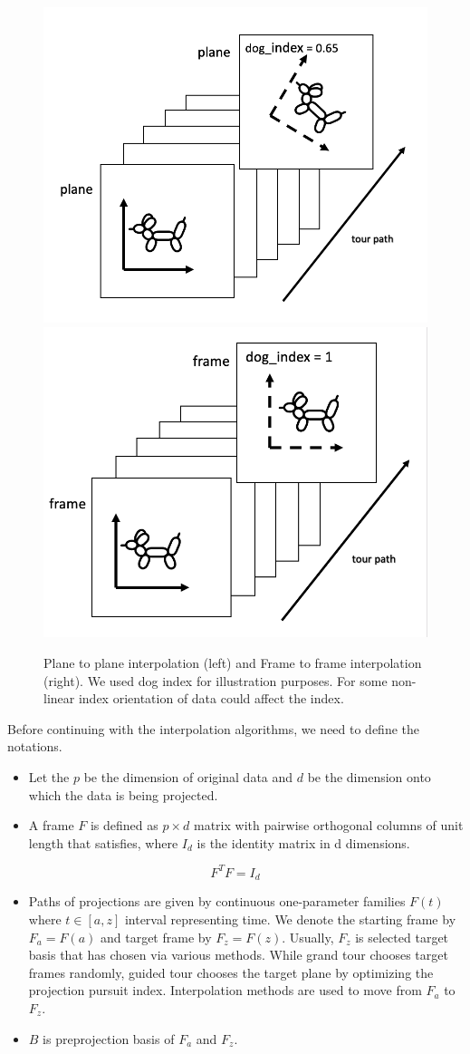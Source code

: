 \begin{Schunk}
\begin{figure}

{\centering \includegraphics[width=0.45\linewidth]{plane} \includegraphics[width=0.45\linewidth]{frame} 

}

\caption[Plane to plane interpolation (left) and Frame to frame interpolation (right)]{Plane to plane interpolation (left) and Frame to frame interpolation (right). We used dog index for illustration purposes. For some non-linear index orientation of data could affect the index.}\label{fig:dogs}
\end{figure}
\end{Schunk}

Before continuing with the interpolation algorithms, we need to define
the notations.

\begin{itemize}
\item
  Let the \(p\) be the dimension of original data and \(d\) be the
  dimension onto which the data is being projected.
\item
  A frame \(F\) is defined as \(p\times d\) matrix with pairwise
  orthogonal columns of unit length that satisfies, where \(I_d\) is the
  identity matrix in d dimensions.
\end{itemize}

\[F^TF = I_d\]

\begin{itemize}
\item
  Paths of projections are given by continuous one-parameter families
  \(F(t)\) where \(t\in [a, z]\) interval representing time. We denote
  the starting frame by \(F_a = F(a)\) and target frame by
  \(F_z = F(z)\). Usually, \(F_z\) is selected target basis that has
  chosen via various methods. While grand tour chooses target frames
  randomly, guided tour chooses the target plane by optimizing the
  projection pursuit index. Interpolation methods are used to move from
  \(F_a\) to \(F_z\).
\item
  \(B\) is preprojection basis of \(F_a\) and \(F_z\).
\end{itemize}

